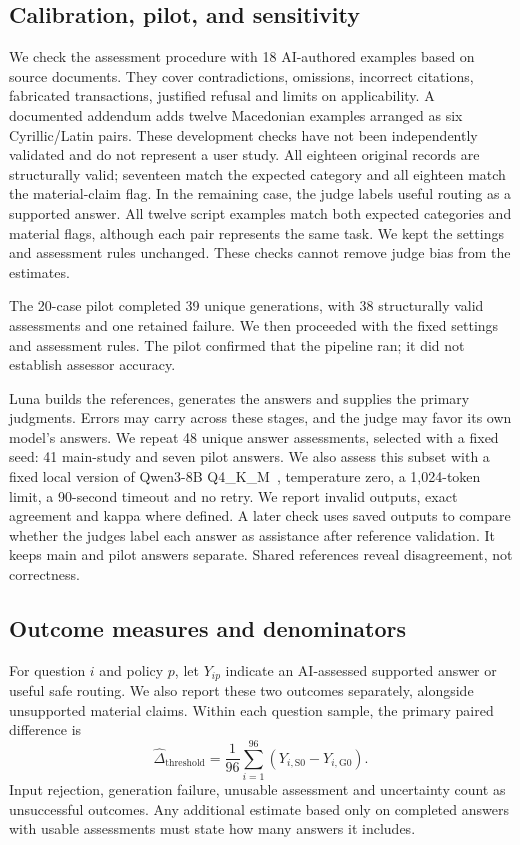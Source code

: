 \documentclass[a4paper,10pt,twocolumn]{article}
\begin{document}
\subsection{Calibration, pilot, and sensitivity}
We check the assessment procedure with 18 AI-authored examples based on source documents. They cover contradictions, omissions, incorrect citations, fabricated transactions, justified refusal and limits on applicability. A documented addendum adds twelve Macedonian examples arranged as six Cyrillic/Latin pairs. These development checks have not been independently validated and do not represent a user study. All eighteen original records are structurally valid; seventeen match the expected category and all eighteen match the material-claim flag. In the remaining case, the judge labels useful routing as a supported answer. All twelve script examples match both expected categories and material flags, although each pair represents the same task. We kept the settings and assessment rules unchanged. These checks cannot remove judge bias from the estimates.

The 20-case pilot completed 39 unique generations, with 38 structurally valid assessments and one retained failure. We then proceeded with the fixed settings and assessment rules. The pilot confirmed that the pipeline ran; it did not establish assessor accuracy.

Luna builds the references, generates the answers and supplies the primary judgments. Errors may carry across these stages, and the judge may favor its own model's answers. We repeat 48 unique answer assessments, selected with a fixed seed: 41 main-study and seven pilot answers. We also assess this subset with a fixed local version of Qwen3-8B Q4\_K\_M~\cite{yang2025qwen3}, temperature zero, a 1,024-token limit, a 90-second timeout and no retry. We report invalid outputs, exact agreement and kappa where defined. A later check uses saved outputs to compare whether the judges label each answer as assistance after reference validation. It keeps main and pilot answers separate. Shared references reveal disagreement, not correctness.

\subsection{Outcome measures and denominators}
For question $i$ and policy $p$, let $Y_{ip}$ indicate an AI-assessed supported answer or useful safe routing. We also report these two outcomes separately, alongside unsupported material claims. Within each question sample, the primary paired difference is
\[
\widehat{\Delta}_{\mathrm{threshold}}=
\frac{1}{96}\sum_{i=1}^{96}(Y_{i,\mathrm{S0}}-Y_{i,\mathrm{G0}}).
\]
Input rejection, generation failure, unusable assessment and uncertainty count as unsuccessful outcomes. Any additional estimate based only on completed answers with usable assessments must state how many answers it includes.
\end{document}
